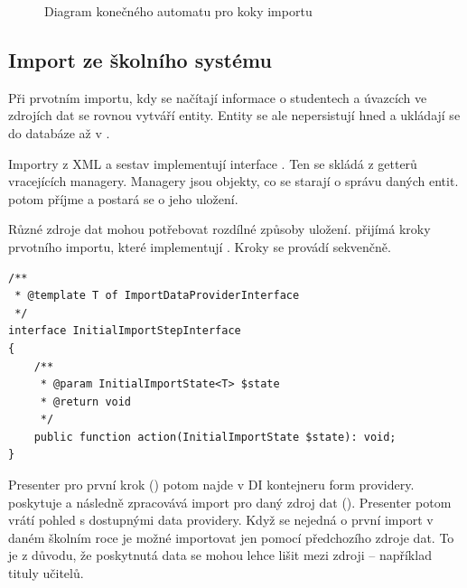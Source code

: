 \clearpage

\begin{figure}
	\centering
\resizebox{!}{0.95\textheight}{\huge{}}
  \caption{Diagram konečného automatu pro koky importu}
  \label{postup:import-diagram}
\end{figure}


\clearpage



\subsection{Import ze školního systému}
Při prvotním importu, kdy se načítají informace o studentech a úvazcích ve zdrojích dat se rovnou vytváří entity.
Entity se ale nepersistují hned a ukládají se do databáze až v .

Importry z XML a sestav implementují interface . Ten se skládá z getterů vracejících managery.
Managery jsou objekty, co se starají o správu daných entit.
 potom příjme  a postará se o jeho uložení. 

Různé zdroje dat mohou potřebovat rozdílné způsoby uložení.
 přijímá kroky prvotního importu, které implementují .
Kroky se provádí sekvenčně.

\begin{code}[H]

  \begin{verbatim}
/**
 * @template T of ImportDataProviderInterface
 */
interface InitialImportStepInterface
{
    /**
     * @param InitialImportState<T> $state
     * @return void
     */
    public function action(InitialImportState $state): void;
}
   \end{verbatim}
  \caption{Zdrojový kód }

\end{code}


Presenter pro první krok () potom najde v DI kontejneru form providery.
 poskytuje a následně zpracovává import pro daný zdroj dat ().
Presenter potom vrátí pohled s dostupnými data providery.
Když se nejedná o první import v daném školním roce je možné importovat jen pomocí předchozího zdroje dat.
To je z důvodu, že poskytnutá data se mohou lehce lišit mezi zdroji -- například tituly učitelů. 





